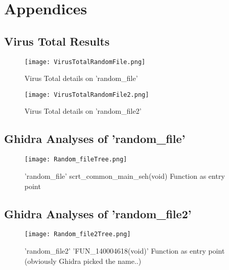 \documentclass[
	letterpaper, %
	10pt, %
	unnumberedsections, %
	twoside, %
]{APAAssignment}
\begin{document}
\chapter{Appendices}
\begin{appendices}

\section{Virus Total Results}\label{app:VirusTotal}
\begin{figure}[!htp] %
	\centering
	\texttt{[image: VirusTotalRandomFile.png]}
	\caption{Virus Total details on 'random\_file'}
	\label{fig:VirusTotalRandomFile}
\end{figure}

\begin{figure}[!htp] %
	\centering
	\texttt{[image: VirusTotalRandomFile2.png]}
	\caption{Virus Total details on 'random\_file2'}
	\label{fig:VirusTotalRandomFile2}
\end{figure}
\clearpage
\section{Ghidra Analyses of 'random\_file'}\label{app:GhidraRandomFile}	
\begin{figure}[!htp] %
	\centering
	\texttt{[image: Random\_fileTree.png]}
	\caption{'random\_file' scrt\_common\_main\_seh(void) Function as entry point}
	\label{fig:GhidraRandomFileTree}
\end{figure}
\clearpage
\section{Ghidra Analyses of 'random\_file2'}\label{app:GhidraRandomFile2}	
\begin{figure}[!htp] %
	\centering
	\texttt{[image: Random\_file2Tree.png]}
	\caption{'random\_file2' 'FUN\_140004618(void)' Function as entry point (obviously Ghidra picked the name..)}
	\label{fig:GhidraRandomFile2Tree}
\end{figure}
\end{appendices}
\end{document}
